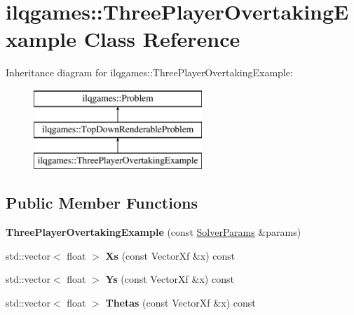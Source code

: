 \hypertarget{classilqgames_1_1_three_player_overtaking_example}{}\section{ilqgames\+:\+:Three\+Player\+Overtaking\+Example Class Reference}
\label{classilqgames_1_1_three_player_overtaking_example}
Inheritance diagram for ilqgames\+:\+:Three\+Player\+Overtaking\+Example\+:\begin{figure}[H]
\begin{center}
\leavevmode
\includegraphics[height=3.000000cm]{classilqgames_1_1_three_player_overtaking_example}
\end{center}
\end{figure}
\subsection*{Public Member Functions}
\begin{DoxyCompactItemize}
\item 
{\bfseries Three\+Player\+Overtaking\+Example} (const \hyperlink{structilqgames_1_1_solver_params}{Solver\+Params} \&params)\hypertarget{classilqgames_1_1_three_player_overtaking_example_aa57d7d8f06af5baba6300118b41a2ab3}{}\label{classilqgames_1_1_three_player_overtaking_example_aa57d7d8f06af5baba6300118b41a2ab3}

\item 
std\+::vector$<$ float $>$ {\bfseries Xs} (const Vector\+Xf \&x) const \hypertarget{classilqgames_1_1_three_player_overtaking_example_ae5d9261dd67bbb2091f767c0f733b52f}{}\label{classilqgames_1_1_three_player_overtaking_example_ae5d9261dd67bbb2091f767c0f733b52f}

\item 
std\+::vector$<$ float $>$ {\bfseries Ys} (const Vector\+Xf \&x) const \hypertarget{classilqgames_1_1_three_player_overtaking_example_a679b545d0d4ee9941fd1ed784702bbd2}{}\label{classilqgames_1_1_three_player_overtaking_example_a679b545d0d4ee9941fd1ed784702bbd2}

\item 
std\+::vector$<$ float $>$ {\bfseries Thetas} (const Vector\+Xf \&x) const \hypertarget{classilqgames_1_1_three_player_overtaking_example_ae93b1b20f879c3ee8c948baeacdca418}{}\label{classilqgames_1_1_three_player_overtaking_example_ae93b1b20f879c3ee8c948baeacdca418}

\end{DoxyCompactItemize}
